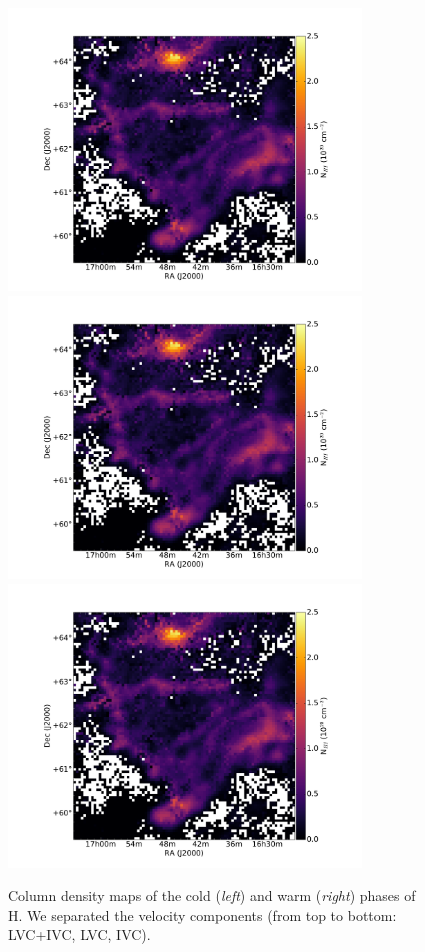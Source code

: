 \documentclass[traditabstract]{aa}
\begin{document}
\begin{figure}[h]
  \hspace{5mm}
  \includegraphics[page=5,height=7.5cm,trim=110 35 105 75,clip=true]{Figures/Phases_GHIGLS/GHIGLS_NHI.pdf} \\
  \vspace{5mm}
  \includegraphics[page=3,height=7.5cm,trim=110 35 105 75,clip=true]{Figures/Phases_GHIGLS/GHIGLS_NHI.pdf}
  \hspace{5mm}
  \includegraphics[page=6,height=7.5cm,trim=110 35 105 75,clip=true]{Figures/Phases_GHIGLS/GHIGLS_NHI.pdf}
  \caption{\label{Phases_GHIGLS} Column density maps of the cold (\emph{left}) and warm (\emph{right}) phases of H. We separated the velocity components (from top to bottom: LVC+IVC, LVC, IVC).}
\end{figure}
\end{document}
